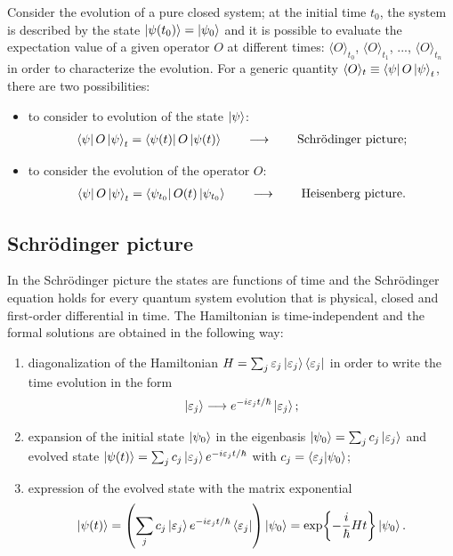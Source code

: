 Consider the evolution of a pure closed system; at the initial time $t_0$, the system is described by the state $\ket{\psi(t_0)} = \ket{\psi_0}$ and it is possible to evaluate the expectation value of a given operator $O$ at different times: $\langle O \rangle_{t_0}$, $\langle O \rangle_{t_1}$, ...,  $\langle O \rangle_{t_n}$ in order to characterize the evolution. For a generic quantity $\langle O \rangle_t \equiv \bra{\psi} O \ket{\psi}_t$, there are two possibilities: 
\begin{itemize}
    \item to consider to evolution of the state $\ket{\psi}$:
    \begin{align*}
        \bra{\psi} O \ket{\psi}_t = \bra{\psi(t)} O \ket{\psi(t)} \qquad \longrightarrow \qquad \text{Schr\"odinger picture;}
    \end{align*}
    \item to consider the evolution of the operator $O$:
    \begin{align*}
        \bra{\psi} O \ket{\psi}_t = \bra{\psi_{t_0}} O(t) \ket{\psi_{t_0}} \qquad \longrightarrow \qquad \text{Heisenberg picture.}
    \end{align*}
\end{itemize}

\subsection{Schr\"odinger picture}

In the Schr\"odinger picture the states are functions of time and the Schr\"odinger equation holds for every quantum system evolution that is physical, closed and first-order differential in time. The Hamiltonian is time-independent and the formal solutions are obtained in the following way:
\begin{enumerate}
    \item diagonalization of the Hamiltonian $H = \sum_j \varepsilon_j \ket{\varepsilon_j}\bra{\varepsilon_j}$ in order to write the time evolution in the form 
    \begin{align*}
        \ket{\varepsilon_j} \longrightarrow e^{-i \varepsilon_j t / \hbar} \ket{\varepsilon_j};
    \end{align*}
    \item expansion of the initial state $\ket{\psi_0}$ in the eigenbasis $\ket{\psi_0} = \sum_j c_j \ket{\varepsilon_j}$ and evolved state $\ket{\psi(t)} = \sum_j c_j \ket{\varepsilon_j} e^{-i \varepsilon_j t / \hbar}$ with $c_j = \braket{\varepsilon_j}{\psi_0}$; 
    \item expression of the evolved state with the matrix exponential
    \begin{align*}
        \ket{\psi(t)} = \left( \sum_j c_j \ket{\varepsilon_j} e^{-i \varepsilon_j t / \hbar} \bra{\varepsilon_j} \right) \ket{\psi_0} = \exp{-\frac{i }{\hbar}Ht} \ket{\psi_0}. 
    \end{align*}
\end{enumerate}


